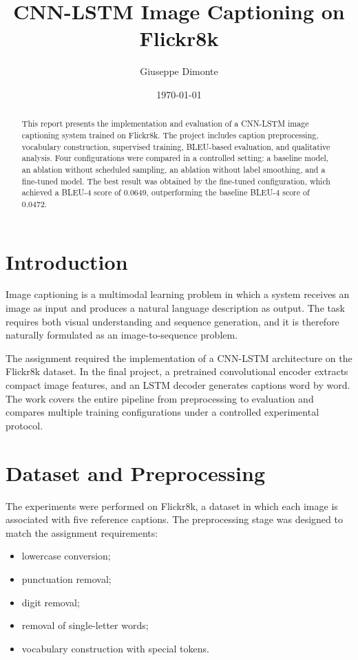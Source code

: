 \documentclass[11pt,a4paper]{article}
\title{CNN-LSTM Image Captioning on Flickr8k}
\author{Giuseppe Dimonte}
\date{\today}
\begin{document}
\maketitle

\begin{abstract}
This report presents the implementation and evaluation of a CNN-LSTM image captioning system trained on Flickr8k. The project includes caption preprocessing, vocabulary construction, supervised training, BLEU-based evaluation, and qualitative analysis. Four configurations were compared in a controlled setting: a baseline model, an ablation without scheduled sampling, an ablation without label smoothing, and a fine-tuned model. The best result was obtained by the fine-tuned configuration, which achieved a BLEU-4 score of 0.0649, outperforming the baseline BLEU-4 score of 0.0472.
\end{abstract}

\section{Introduction}

Image captioning is a multimodal learning problem in which a system receives an image as input and produces a natural language description as output. The task requires both visual understanding and sequence generation, and it is therefore naturally formulated as an image-to-sequence problem.

The assignment required the implementation of a CNN-LSTM architecture on the Flickr8k dataset. In the final project, a pretrained convolutional encoder extracts compact image features, and an LSTM decoder generates captions word by word. The work covers the entire pipeline from preprocessing to evaluation and compares multiple training configurations under a controlled experimental protocol.

\section{Dataset and Preprocessing}

The experiments were performed on Flickr8k, a dataset in which each image is associated with five reference captions. The preprocessing stage was designed to match the assignment requirements:
\begin{itemize}[leftmargin=*]
    \item lowercase conversion;
    \item punctuation removal;
    \item digit removal;
    \item removal of single-letter words;
    \item vocabulary construction with special tokens.
\end{itemize}
\end{document}
